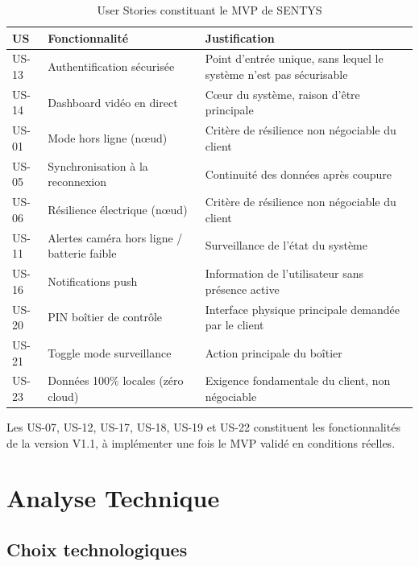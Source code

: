 \documentclass[12pt,a4paper]{article}
\begin{document}
\begin{table}[H]
\centering
\small
\renewcommand{\arraystretch}{1.3}
\begin{tabular}{|l|p{4cm}|p{6cm}|}
\hline
\textbf{US} & \textbf{Fonctionnalité} & \textbf{Justification} \\
\hline
US-13 & Authentification sécurisée & Point d'entrée unique, sans lequel le système n'est pas sécurisable \\
\hline
US-14 & Dashboard vidéo en direct & Cœur du système, raison d'être principale \\
\hline
US-01 & Mode hors ligne (nœud) & Critère de résilience non négociable du client \\
\hline
US-05 & Synchronisation à la reconnexion & Continuité des données après coupure \\
\hline
US-06 & Résilience électrique (nœud) & Critère de résilience non négociable du client \\
\hline
US-11 & Alertes caméra hors ligne / batterie faible & Surveillance de l'état du système \\
\hline
US-16 & Notifications push & Information de l'utilisateur sans présence active \\
\hline
US-20 & PIN boîtier de contrôle & Interface physique principale demandée par le client \\
\hline
US-21 & Toggle mode surveillance & Action principale du boîtier \\
\hline
US-23 & Données 100\% locales (zéro cloud) & Exigence fondamentale du client, non négociable \\
\hline
\end{tabular}
\caption{User Stories constituant le MVP de SENTYS}
\end{table}

Les US-07, US-12, US-17, US-18, US-19 et US-22 constituent les fonctionnalités de la version V1.1, à implémenter une fois le MVP validé en conditions réelles.

\section{Analyse Technique}

\subsection{Choix technologiques}
\end{document}
